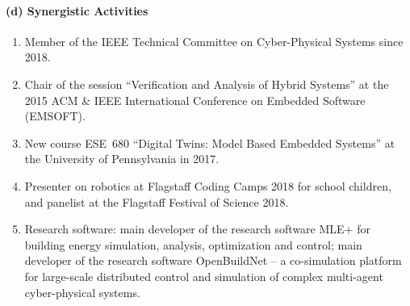 \documentclass[11pt]{article}
\begin{document}


\paragraph{(d) Synergistic Activities}


\begin{enumerate}
\item Member of the IEEE Technical Committee on Cyber-Physical Systems since 2018.
\item Chair of the session ``Verification and Analysis of Hybrid Systems'' at the 2015 {ACM} \& {IEEE} International Conference on Embedded Software ({EMSOFT}).
\item New course ESE~680 ``Digital Twins: Model Based Embedded Systems'' at the University of Pennsylvania in 2017.
\item Presenter on robotics at Flagstaff Coding Camps 2018 for school children, and panelist at the Flagstaff Festival of Science 2018.
\item Research software: main developer of the research software MLE+ for building energy simulation, analysis, optimization and control;  main developer of the research software OpenBuildNet -- a co-simulation platform for large-scale distributed control and simulation of complex multi-agent cyber-physical systems.
\end{enumerate}



%
%
\end{document}
